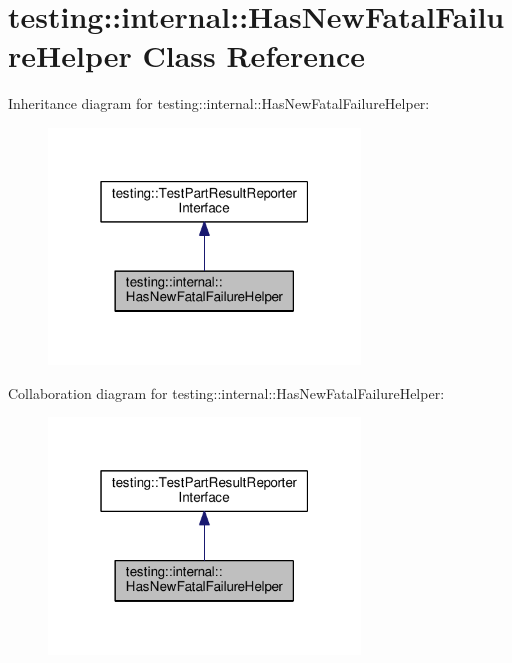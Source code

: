\hypertarget{classtesting_1_1internal_1_1_has_new_fatal_failure_helper}{}\section{testing\+:\+:internal\+:\+:Has\+New\+Fatal\+Failure\+Helper Class Reference}
\label{classtesting_1_1internal_1_1_has_new_fatal_failure_helper}


Inheritance diagram for testing\+:\+:internal\+:\+:Has\+New\+Fatal\+Failure\+Helper\+:
\nopagebreak
\begin{figure}[H]
\begin{center}
\leavevmode
\includegraphics[width=235pt]{classtesting_1_1internal_1_1_has_new_fatal_failure_helper__inherit__graph}
\end{center}
\end{figure}


Collaboration diagram for testing\+:\+:internal\+:\+:Has\+New\+Fatal\+Failure\+Helper\+:
\nopagebreak
\begin{figure}[H]
\begin{center}
\leavevmode
\includegraphics[width=235pt]{classtesting_1_1internal_1_1_has_new_fatal_failure_helper__coll__graph}
\end{center}
\end{figure}
